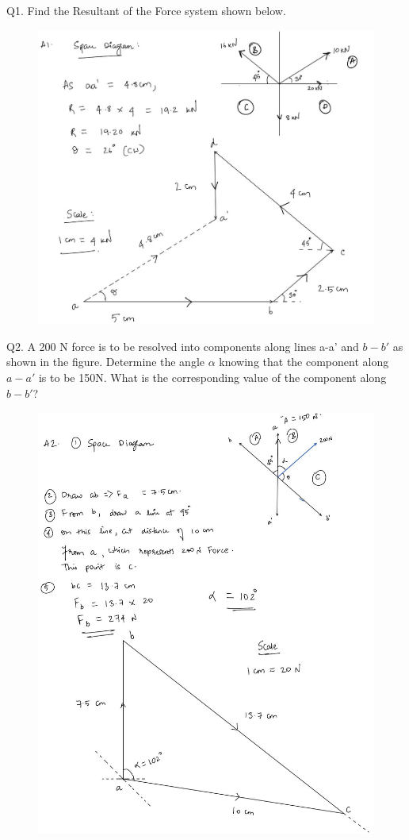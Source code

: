 \documentclass[11pt]{article}
\begin{document}
Q1. Find the Resultant of the Force system shown below. 
\begin{figure}[H]
	\includegraphics[scale=0.45]{g1.jpg}
	\label{fig: Polygon Law}
\end{figure}


\pagebreak
Q2. A 200 N force is to be resolved into components along lines a-a' and $ b-b' $ as shown in the figure. Determine the angle $\alpha$ knowing that the component along $ a-a' $ is to be 150N. What is the corresponding value of the component along $ b-b' $?
\begin{figure}[H]
	\includegraphics[scale=0.39]{g2.jpg}
	\label{fig: Polygon Law}
\end{figure}
\end{document}
